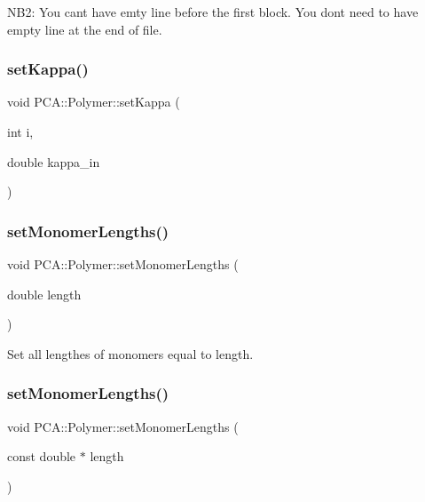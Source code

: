 N\+B2\+: You can\textquotesingle{}t have emty line before the first block. You don\textquotesingle{}t need to have empty line at the end of file. \hypertarget{class_p_c_a_1_1_polymer_ac8631ac2842b00802f24478b525c05db}{}\label{class_p_c_a_1_1_polymer_ac8631ac2842b00802f24478b525c05db} 
\subsubsection{\texorpdfstring{set\+Kappa()}{setKappa()}}
{\footnotesize\ttfamily void P\+C\+A\+::\+Polymer\+::set\+Kappa (\begin{DoxyParamCaption}\item[{int}]{i,  }\item[{double}]{kappa\+\_\+in }\end{DoxyParamCaption})\hspace{0.3cm}{\ttfamily [inline]}}

\hypertarget{class_p_c_a_1_1_polymer_a6b1e36cd67148470485df9b99380d8a8}{}\label{class_p_c_a_1_1_polymer_a6b1e36cd67148470485df9b99380d8a8} 
\subsubsection{\texorpdfstring{set\+Monomer\+Lengths()}{setMonomerLengths()}\hspace{0.1cm}{\footnotesize\ttfamily [1/2]}}
{\footnotesize\ttfamily void P\+C\+A\+::\+Polymer\+::set\+Monomer\+Lengths (\begin{DoxyParamCaption}\item[{double}]{length }\end{DoxyParamCaption})}



Set all lengthes of monomers equal to length. 

\hypertarget{class_p_c_a_1_1_polymer_a7939514917930c0d2419fd1d0390c889}{}\label{class_p_c_a_1_1_polymer_a7939514917930c0d2419fd1d0390c889} 
\subsubsection{\texorpdfstring{set\+Monomer\+Lengths()}{setMonomerLengths()}\hspace{0.1cm}{\footnotesize\ttfamily [2/2]}}
{\footnotesize\ttfamily void P\+C\+A\+::\+Polymer\+::set\+Monomer\+Lengths (\begin{DoxyParamCaption}\item[{const double $\ast$}]{length }\end{DoxyParamCaption})}



